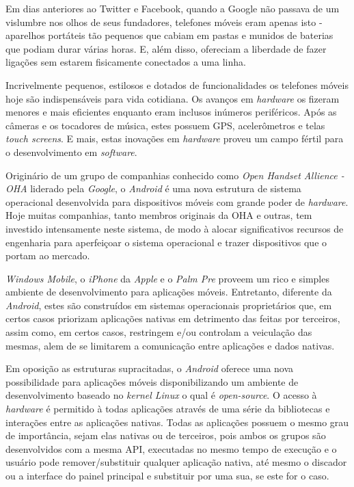 \documentclass[12pt,a4paper,oneside]{report}
\begin{document}
Em dias anteriores ao Twitter e Facebook, quando a Google não passava de um vislumbre nos olhos de seus fundadores, telefones móveis eram apenas isto - aparelhos portáteis tão pequenos que cabiam em pastas e munidos de baterias que podiam durar várias horas. E, além disso, ofereciam a liberdade de fazer ligações sem estarem fisicamente conectados a uma linha.

Incrivelmente pequenos, estilosos e dotados de funcionalidades os telefones móveis hoje são indispensáveis para vida cotidiana. Os avanços em \emph{hardware} os fizeram menores e mais eficientes enquanto eram inclusos inúmeros periféricos. Após as câmeras e os tocadores de música, estes possuem GPS, acelerômetros e telas \emph{touch screens}. E mais, estas inovações em \emph{hardware} proveu um campo fértil para o desenvolvimento em \emph{software}.

Originário de um grupo de companhias conhecido como \emph{Open Handset Allience - OHA} liderado pela \emph{Google}, o \emph{Android} é uma nova estrutura de sistema operacional desenvolvida para dispositivos móveis com grande poder de \emph{hardware}. Hoje muitas companhias, tanto membros originais da OHA e outras, tem investido intensamente neste sistema, de modo à alocar significativos recursos de engenharia para aperfeiçoar o sistema operacional e trazer dispositivos que o portam ao mercado.

\emph{Windows Mobile}, o \emph{iPhone} da \emph{Apple} e o \emph{Palm Pre} proveem um rico e simples ambiente de desenvolvimento para aplicações móveis. Entretanto, diferente da \emph{Android}, estes são construídos em sistemas operacionais proprietários que, em certos casos priorizam aplicações nativas em detrimento das feitas por terceiros, assim como, em certos casos, restringem e/ou controlam a veiculação das mesmas, alem de se limitarem a comunicação entre aplicações e dados nativas.

Em oposição as estruturas supracitadas, o \emph{Android} oferece uma nova possibilidade para aplicações móveis disponibilizando um ambiente de desenvolvimento baseado no \emph{kernel Linux} o qual é \emph{open-source}. O acesso à \emph{hardware} é permitido à todas aplicações através de uma série da bibliotecas e interações entre as aplicações nativas. Todas as aplicações possuem o mesmo grau de importância, sejam elas nativas ou de terceiros, pois ambos os grupos são desenvolvidos com a mesma API, executadas no mesmo tempo de execução e o usuário pode remover/substituir qualquer aplicação nativa, até mesmo o discador ou a interface do painel principal e substituir por uma sua, se este for o caso.
\end{document}
